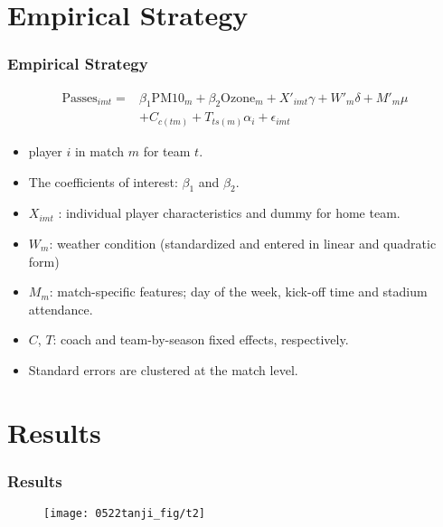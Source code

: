 \documentclass[dvipdfmx,11pt]{beamer}
\begin{document}
\section{Empirical Strategy}

\begin{frame}\frametitle{Empirical Strategy}
  \begin{align*}
    \text{Passes}_{imt} = & \beta_1 \text{PM10}_m + \beta_2 \text{Ozone}_m + X'_{imt}\gamma + W'_m \delta + M'_m \mu \\
    & + C_{c(tm)} + T_{ts(m)} \alpha_i + \epsilon_{imt}
  \end{align*}
  \begin{itemize}
    \footnotesize
    \item player $i$ in match $m$ for team $t$.
    \item The coefficients of interest: $\beta_1$ and $\beta_2$.
    \item $X_{imt}$ : individual player characteristics and dummy for home team.
    \item $W_m$: weather condition (standardized and entered in linear and quadratic form)
    \item $M_m$: match-specific features; day of the week, kick-off time and stadium attendance.
    \item $C$, $T$: coach and team-by-season fixed effects, respectively.
    \item Standard errors are clustered at the match level.
  \end{itemize}
\end{frame}

\section{Results}

\begin{frame}\frametitle{Results}
  \begin{figure}
    \centering
    \texttt{[image: 0522tanji\_fig/t2]}
    \label{t2}
  \end{figure}
\end{frame}
\end{document}
